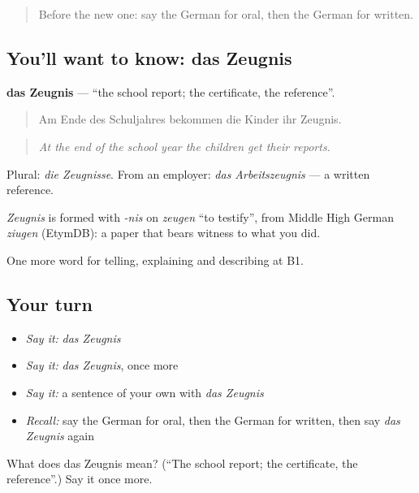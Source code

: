 \label{lesson:GE-C375-zeugnis}



\begin{quote}
Before the new one: say the German for oral, then the German for written.
\end{quote}

\subsection*{You'll want to know: das Zeugnis}
\textbf{das Zeugnis} — \textquotedblleft{}the school report; the certificate, the reference\textquotedblright{}.

\begin{quote}
Am Ende des Schuljahres bekommen die Kinder ihr Zeugnis.
\end{quote}

\begin{quote}
\emph{At the end of the school year the children get their reports.}
\end{quote}

Plural: \emph{die Zeugnisse}. From an employer: \emph{das Arbeitszeugnis} — a written reference.

\begin{cousinweb}
\emph{Zeugnis} is formed with \emph{-nis} on \emph{zeugen} \textquotedblleft{}to testify\textquotedblright{}, from Middle High German \emph{ziugen} (EtymDB): a paper that bears witness to what you did.
\end{cousinweb}

\begin{grammarlens}[title={What you've built}]
One more word for telling, explaining and describing at B1.
\end{grammarlens}

\subsection*{Your turn}
\begin{itemize}
\raggedright
  \item \emph{Say it:} \emph{das Zeugnis}
  \item \emph{Say it:} \emph{das Zeugnis}, once more
  \item \emph{Say it:} a sentence of your own with \emph{das Zeugnis}
  \item \emph{Recall:} say the German for oral, then the German for written, then say \emph{das Zeugnis} again
\end{itemize}

\begin{tcolorbox}[breakable,colback=teal!4,colframe=teal!35!black,title={Before you move on}]
What does das Zeugnis mean? (\textquotedblleft{}The school report; the certificate, the reference\textquotedblright{}.) Say it once more.
\end{tcolorbox}
